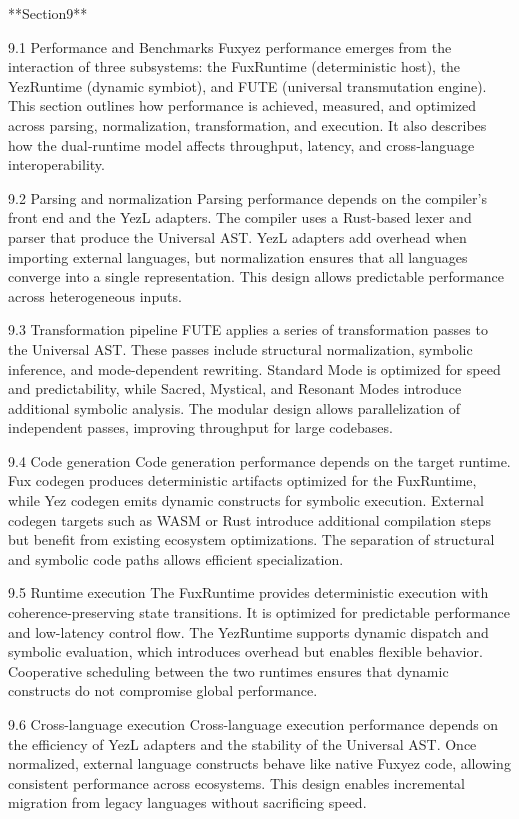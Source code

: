 **Section9**

9.1 Performance and Benchmarks
Fuxyez performance emerges from the interaction of three subsystems: the FuxRuntime (deterministic host), the YezRuntime (dynamic symbiot), and FUTE (universal transmutation engine). This section outlines how performance is achieved, measured, and optimized across parsing, normalization, transformation, and execution. It also describes how the dual‑runtime model affects throughput, latency, and cross‑language interoperability.

9.2 Parsing and normalization
Parsing performance depends on the compiler’s front end and the YezL adapters. The compiler uses a Rust-based lexer and parser that produce the Universal AST. YezL adapters add overhead when importing external languages, but normalization ensures that all languages converge into a single representation. This design allows predictable performance across heterogeneous inputs.

9.3 Transformation pipeline
FUTE applies a series of transformation passes to the Universal AST. These passes include structural normalization, symbolic inference, and mode-dependent rewriting. Standard Mode is optimized for speed and predictability, while Sacred, Mystical, and Resonant Modes introduce additional symbolic analysis. The modular design allows parallelization of independent passes, improving throughput for large codebases.

9.4 Code generation
Code generation performance depends on the target runtime. Fux codegen produces deterministic artifacts optimized for the FuxRuntime, while Yez codegen emits dynamic constructs for symbolic execution. External codegen targets such as WASM or Rust introduce additional compilation steps but benefit from existing ecosystem optimizations. The separation of structural and symbolic code paths allows efficient specialization.

9.5 Runtime execution
The FuxRuntime provides deterministic execution with coherence-preserving state transitions. It is optimized for predictable performance and low-latency control flow. The YezRuntime supports dynamic dispatch and symbolic evaluation, which introduces overhead but enables flexible behavior. Cooperative scheduling between the two runtimes ensures that dynamic constructs do not compromise global performance.

9.6 Cross-language execution
Cross-language execution performance depends on the efficiency of YezL adapters and the stability of the Universal AST. Once normalized, external language constructs behave like native Fuxyez code, allowing consistent performance across ecosystems. This design enables incremental migration from legacy languages without sacrificing speed.

